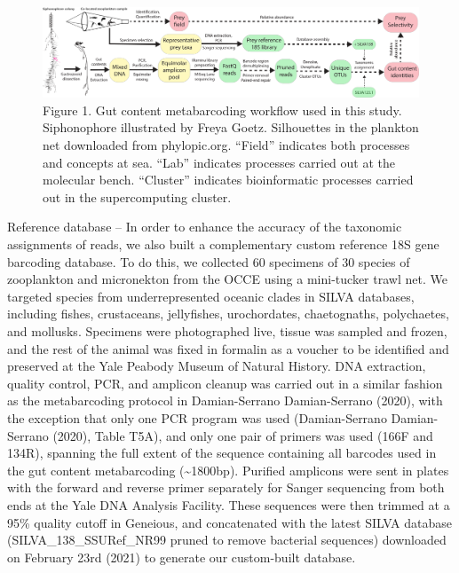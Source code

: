 \documentclass[12pt,]{article}
\begin{document}
\begin{figure}
\centering
\includegraphics{Figures/methods.png}
\caption{\label{methods_fig} Figure 1. Gut content metabarcoding workflow used in this study. Siphonophore illustrated by Freya Goetz. Silhouettes in the plankton net downloaded from phylopic.org. ``Field'' indicates both processes and concepts at sea. ``Lab'' indicates processes carried out at the molecular bench. ``Cluster'' indicates bioinformatic processes carried out in the supercomputing cluster.}
\end{figure}

Reference database -- In order to enhance the accuracy of the taxonomic assignments of reads, we also built a complementary custom reference 18S gene barcoding database. To do this, we collected 60 specimens of 30 species of zooplankton and micronekton from the OCCE using a mini-tucker trawl net. We targeted species from underrepresented oceanic clades in SILVA databases, including fishes, crustaceans, jellyfishes, urochordates, chaetognaths, polychaetes, and mollusks. Specimens were photographed live, tissue was sampled and frozen, and the rest of the animal was fixed in formalin as a voucher to be identified and preserved at the Yale Peabody Museum of Natural History. DNA extraction, quality control, PCR, and amplicon cleanup was carried out in a similar fashion as the metabarcoding protocol in Damian-Serrano Damian-Serrano (2020), with the exception that only one PCR program was used (Damian-Serrano Damian-Serrano (2020), Table T5A), and only one pair of primers was used (166F and 134R), spanning the full extent of the sequence containing all barcodes used in the gut content metabarcoding (\textasciitilde{}1800bp). Purified amplicons were sent in plates with the forward and reverse primer separately for Sanger sequencing from both ends at the Yale DNA Analysis Facility. These sequences were then trimmed at a 95\% quality cutoff in Geneious, and concatenated with the latest SILVA database (SILVA\_138\_SSURef\_NR99 pruned to remove bacterial sequences) downloaded on February 23rd (2021) to generate our custom-built database.
\end{document}
